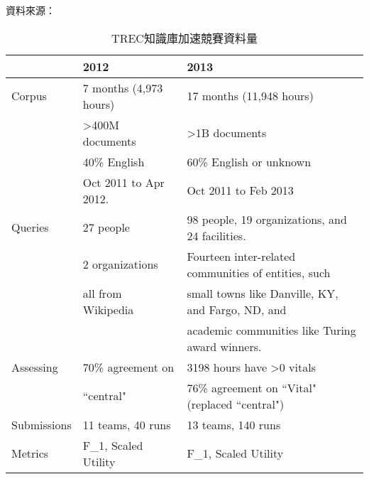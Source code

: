 \begin{table}
    \caption{TREC知識庫加速競賽資料量}
    \label{t:kba-corps}
    \centering
    資料來源：\cite{kba2013}
    \begin{center}
    \footnotesize
    \begin{tabular}{|l|l|l|}
        \hline
            & 2012 & 2013 \\ \hline
        Corpus & 7 months (4,973 hours) & 17 months (11,948 hours)\\
            & >400M documents & >1B documents\\
            & 40\% English & 60\% English or unknown\\
        & Oct 2011 to Apr 2012. & Oct 2011 to Feb 2013\\
        \hline
        Queries & 27 people & 98 people, 19 organizations, and 24 facilities. \\
                & 2 organizations & Fourteen inter-related communities of entities, such \\
                & all from Wikipedia & small towns like Danville, KY, and Fargo, ND, and \\
        & & academic communities like Turing award winners. \\
        \hline
        Assessing & 70\% agreement on & 3198 hours have >0 vitals \\
        & ``central" & 76\% agreement on ``Vital" (replaced ``central") \\
        \hline
        Submissions & 11 teams, 40 runs & 13 teams, 140 runs \\
        \hline
        Metrics & F\_1, Scaled Utility & F\_1, Scaled Utility \\
        \hline
    \end{tabular}
    \end{center}
\end{table}
